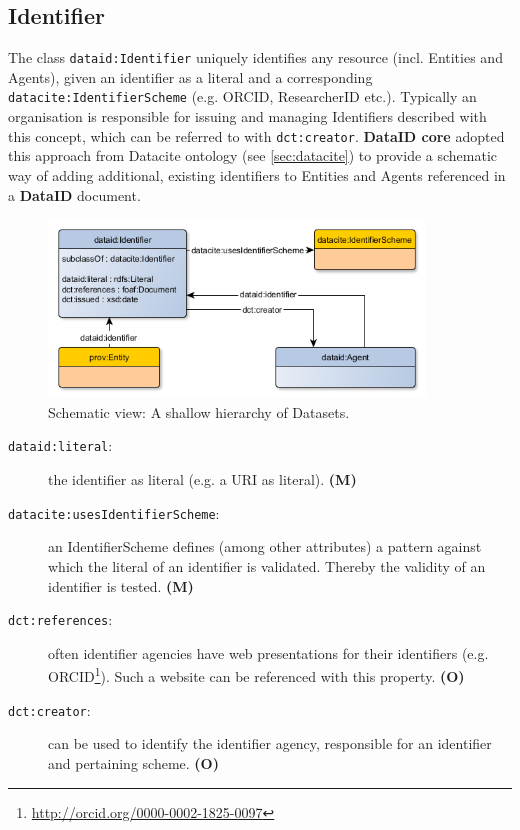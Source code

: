 \documentclass[a4paper,english,twoside,BCOR1.5cm,headsepline,DIV12,appendixprefix,final,12pt]{scrbook}
\newcommand{\dataid}{{\ttfamily\bfseries DataID}\xspace}
\newcommand{\core}{{\ttfamily\bfseries DataID core}\xspace}
\newcommand{\prop}[1]{{{\texttt{#1}}}}
\newcommand\footnoteurl[1]{\footnote{\scriptsize\url{#1}}}
\begin{document}
\subsection{Identifier} 
\label{sec:coreidentifier}
The class \prop{dataid:Identifier} uniquely identifies any resource (incl. Entities and Agents), given an identifier as a literal and a corresponding \prop{datacite:IdentifierScheme} (e.g. ORCID, ResearcherID etc.). Typically an organisation is responsible for issuing and managing Identifiers described with this concept, which can be referred to with \prop{dct:creator}. \core adopted this approach from Datacite ontology (see \cref{sec:datacite}) to provide a schematic way of adding additional, existing identifiers to Entities and Agents referenced in a \dataid document.
\begin{figure}[!htbp]
\centering
  \includegraphics[width=10cm]{images/ClassIdentifier.png}
  \caption{Schematic view: A shallow hierarchy of Datasets.}
  \label{fig:example}
\end{figure}

\begin{description}
\item[\prop{dataid:literal}:] the identifier as literal (e.g. a URI as literal). \textbf{(M)}
\item[\prop{datacite:usesIdentifierScheme}:] an IdentifierScheme defines (among other attributes) a pattern against which the literal of an identifier is validated. Thereby the validity of an identifier is tested. \textbf{(M)}
\item[\prop{dct:references}:] often identifier agencies have web presentations for their identifiers (e.g. ORCID\footnoteurl{http://orcid.org/0000-0002-1825-0097}). Such a website can be referenced with this property. \textbf{(O)}
\item[\prop{dct:creator}:] can be used to identify the identifier agency, responsible for an identifier and pertaining scheme. \textbf{(O)}
\end{description}
\end{document}
